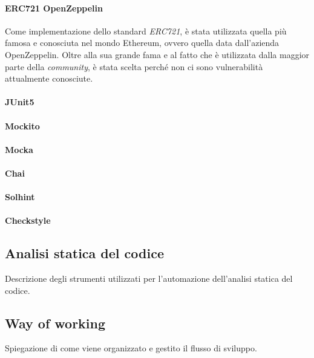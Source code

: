 \paragraph{ERC721 OpenZeppelin}
Come implementazione dello standard \textit{ERC721}, è stata utilizzata quella più famosa e conosciuta nel mondo Ethereum, ovvero quella data dall'azienda OpenZeppelin. Oltre alla sua grande fama e al fatto che è utilizzata dalla maggior parte della \textit{community}, è stata scelta perché non ci sono vulnerabilità attualmente conosciute.

\paragraph{JUnit5}


\paragraph{Mockito}

\paragraph{Mocka}

\paragraph{Chai}

\paragraph{Solhint}

\paragraph{Checkstyle}


\subsection{Analisi statica del codice}
Descrizione degli strumenti utilizzati per l'automazione dell'analisi statica del codice.

\subsection{Way of working}
Spiegazione di come viene organizzato e gestito il flusso di sviluppo.
